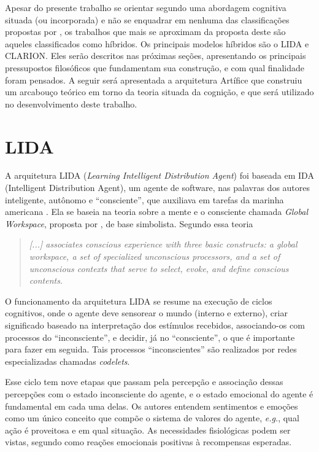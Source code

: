 Apesar do presente trabalho se orientar segundo uma abordagem cognitiva situada (ou incorporada) \cite{Santos2004} e não se enquadrar em nenhuma das classificações propostas por , os trabalhos que mais se aproximam da proposta deste são aqueles classificados como híbridos. Os principais modelos híbridos são o LIDA e CLARION. Eles serão descritos nas próximas seções, apresentando os principais pressupostos filosóficos que fundamentam sua construção, e com qual finalidade foram pensados. A seguir será apresentada a arquitetura Artífice que construiu um arcabouço teórico em torno da teoria situada da cognição, e que será utilizado no desenvolvimento deste trabalho.


\section{LIDA}
\label{sec:lida}
A arquitetura LIDA (\textit{Learning Intelligent Distribution Agent}) foi baseada em IDA (Intelligent Distribution Agent), um agente de software, nas palavras dos autores inteligente, autônomo e ``consciente'', que auxiliava em tarefas da marinha americana \cite{Franklin2006}. Ela se baseia na teoria sobre a mente e o consciente chamada \textit{Global Workspace}, proposta por , de base simbolista. Segundo  essa teoria

\begin{quotation}
\textit{
[...] associates conscious experience with three basic
constructs: a global workspace, a set of specialized unconscious
processors, and a set of unconscious contexts
that serve to select, evoke, and define conscious contents.} \cite{Ramamurthy2006}
\end{quotation} 

O funcionamento da arquitetura LIDA se resume na execução de ciclos cognitivos, onde o agente deve sensorear o mundo (interno e externo), criar significado baseado na interpretação dos estímulos recebidos, associando-os com processos do ``inconsciente'', e decidir, já no ``consciente'', o que é importante para fazer em seguida.  Tais processos ``inconscientes'' são realizados por redes especializadas chamadas \textit{codelets}. 

Esse ciclo tem nove etapas que passam pela percepção e associação dessas percepções com o estado inconsciente do agente, e o estado emocional do agente é fundamental em cada uma delas. Os autores entendem sentimentos e emoções como um único conceito que compõe o sistema de valores do agente, \textit{e.g.}, qual ação é proveitosa e em qual situação. As necessidades fisiológicas  podem ser vistas, segundo  como reações emocionais positivas à recompensas esperadas.

